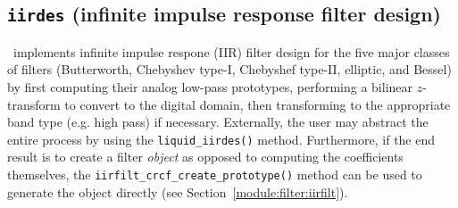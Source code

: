 % 
%
\subsection{{\tt iirdes} (infinite impulse response filter design)}
\label{module:filter:iirdes}
\liquid\ implements infinite impulse respone (IIR) filter design for the
five major classes of filters
(Butterworth, Chebyshev type-I, Chebyshef type-II, elliptic, and Bessel)
by
first computing their analog low-pass prototypes, performing a bilinear
$z$-transform to convert to the digital domain, then transforming to the
appropriate band type (e.g. high pass) if necessary.
Externally, the user may abstract the entire process by using the
{\tt liquid\_iirdes()} method.
Furthermore, if the end result is to create a filter {\em object} as
opposed to computing the coefficients themselves, the
{\tt iirfilt\_crcf\_create\_prototype()} method can be used to generate
the object directly
(see Section~\ref{module:filter:iirfilt}).

